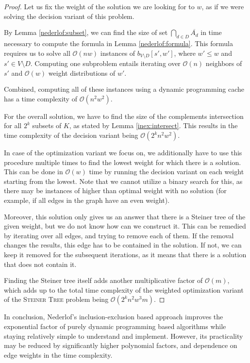 \documentclass[thesis=M,english,hidelinks]{FITthesis}[2012/10/20]
\theoremstyle{definition}
\begin{document}
\begin{proof}
    Let us fix the weight of the solution we are looking for to $w$, as if we were solving the decision variant of this
    problem.

    By Lemma \ref{nederlof:subset}, we can find the size of set $\bigcap_{d \in D} \overline{A_d}$ in time necessary to
    compute the formula in Lemma \ref{nederlof:formula}. This formula requires us to solve all $\mathcal{O}(n w)$ instances of $b_{V
    \setminus D}[s', w']$, where $w' \leq w$ and $s' \in V \setminus D$. Computing one subproblem entails iterating over
    $\mathcal{O}(n)$ neighbors of $s'$ and $\mathcal{O}(w)$ weight distributions of $w'$.

    Combined, computing all of these instances using a dynamic programming cache has a time complexity of
    $\mathcal{O}(n^2 w^2)$.

    For the overall solution, we have to find the size of the complements intersection for all $2^k$ subsets of $K$, as stated
    by Lemma \ref{inex:intersect}. This results in the time complexity of the decision variant being $\mathcal{O}(2^k
    n^2 w^2)$.

    In case of the optimization variant we focus on, we additionally have to use this procedure multiple times to find
    the lowest weight for which there is a solution. This can be done in $\mathcal{O}(w)$ time by running the decision
    variant on each weight starting from the lowest. Note that we cannot utilize a binary search for this, as there may
    be instances of higher than optimal weight with no solution (for example, if all edges in the graph have an even
    weight).

    Moreover, this solution only gives us an answer that there is a Steiner tree of the given weight, but we do not know
    how can we construct it. This can be remedied by iterating over all edges, and trying to remove each of them. If the
    removal changes the results, this edge has to be contained in the solution. If not, we can keep it removed for the
    subsequent iterations, as it means that there is a solution that does not contain it.

    Finding the Steiner tree itself adds another multiplicative factor of $\mathcal{O}(m)$, which adds up to the total
    time complexity of the weighted optimization variant of the \textsc{Steiner Tree} problem being $\mathcal{O}(2^k n^2
    w^3 m)$.
\end{proof}

In conclusion, Nederlof's inclusion-exclusion based approach improves the exponential factor of purely dynamic
programming based algorithms while staying relatively simple to understand and implement. However, its practicality may
be reduced by significantly higher polynomial factors, and dependence on edge weights in the time complexity.
\end{document}
